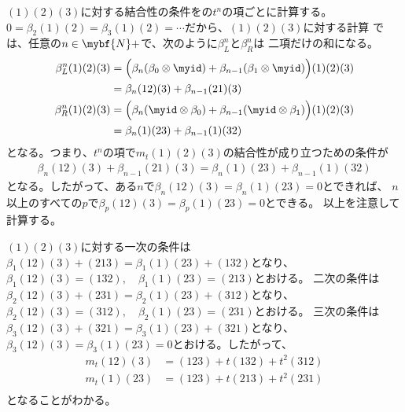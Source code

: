 	$(1)(2)(3)$に対する結合性の条件をの$t^n$の項ごとに計算する。
	$0=\beta_2(1)(2)=\beta_3(1)(2)=\cdots$だから、$(1)(2)(3)$に対する計算
	では、任意の$n\in\mybf{N}+$で、次のように$\beta_L^n$と$\beta_R^n$は
	二項だけの和になる。
	\begin{equation*}\begin{split} %
		\beta_L^n(1)(2)(3) &= \Bigl(\beta_n(\beta_0\otimes \myid)
		+\beta_{n-1}(\beta_1\otimes \myid)\Bigr)(1)(2)(3) \\
		&= \beta_n(12)(3) + \beta_{n-1}(21)(3) \\
		\beta_R^n(1)(2)(3) &= \Bigl(\beta_n(\myid\otimes \beta_0)
		+\beta_{n-1}(\myid\otimes \beta_1)\Bigr)(1)(2)(3) \\
		&= \beta_n(1)(23) + \beta_{n-1}(1)(32) \\
	\end{split}\end{equation*} %
	となる。つまり、$t^n$の項で$m_t(1)(2)(3)$の結合性が成り立つための条件が
	\begin{equation*}\begin{split} %
		\beta_n(12)(3) + \beta_{n-1}(21)(3)
		=\beta_n(1)(23) + \beta_{n-1}(1)(32)
	\end{split}\end{equation*} %
	となる。したがって、ある$n$で$\beta_n(12)(3)=\beta_n(1)(23)=0$とできれば、
	$n$以上のすべての$p$で$\beta_p(12)(3)=\beta_p(1)(23)=0$とできる。
	以上を注意して計算する。

	$(1)(2)(3)$に対する一次の条件は
	$\beta_1(12)(3) + (213)=\beta_1(1)(23) + (132)$となり、
	$\beta_1(12)(3) = (132),\quad \beta_1(1)(23) = (213)$とおける。 
	二次の条件は$\beta_2(12)(3)+(231)=\beta_2(1)(23)+(312)$となり、
	$\beta_2(12)(3)=(312),\quad\beta_2(1)(23)=(231)$とおける。
	三次の条件は$\beta_3(12)(3)+(321)= \beta_3(1)(23)+(321)$となり、
	$\beta_3(12)(3)=\beta_3(1)(23)=0$とおける。したがって、
	\begin{equation*}\begin{split} %
		m_t(12)(3) &= (123) + t(132) + t^2(312) \\
		m_t(1)(23) &= (123) + t(213) + t^2(231) \\
	\end{split}\end{equation*} %
	となることがわかる。

